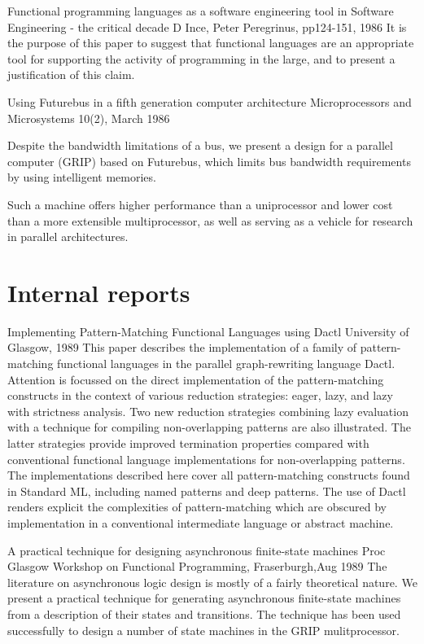 {Functional programming languages as a software engineering tool}
{in Software Engineering - the critical decade D Ince,
Peter Peregrinus, pp124-151, 1986}
{
It is the purpose of this paper to suggest that functional
languages are an appropriate tool for supporting the activity
of programming in the large, and to present a justification of
this claim.
}

{Using Futurebus in a fifth generation computer architecture}
{Microprocessors and Microsystems 10(2), March 1986}
{
Despite the bandwidth limitations of a bus, we present a design
for a parallel computer (GRIP) based on Futurebus, which limits bus
bandwidth requirements by using intelligent memories.

Such a machine offers higher performance than a uniprocessor
and lower cost than a more extensible multiprocessor, as well
as serving as a vehicle for research in parallel architectures.
}


\section{Internal reports}

{Implementing Pattern-Matching Functional Languages using Dactl}
{University of Glasgow, 1989}
{
This paper describes the implementation of a family of  pattern-matching
functional  languages  in  the  parallel graph-rewriting language Dactl.
Attention  is   focussed   on   the   direct   implementation   of   the
pattern-matching   constructs   in  the  context  of  various  reduction
strategies: eager, lazy, and lazy with  strictness  analysis.   Two  new
reduction  strategies  combining  lazy  evaluation  with a technique for
compiling non-overlapping patterns are  also  illustrated.   The  latter
strategies   provide   improved  termination  properties  compared  with
conventional functional  language  implementations  for  non-overlapping
patterns.  The implementations described here cover all pattern-matching
constructs found in Standard  ML,  including  named  patterns  and  deep
patterns.   The  use  of  Dactl  renders  explicit  the  complexities of
pattern-matching which are obscured by implementation in a  conventional
intermediate language or abstract machine.
}

{A practical technique for designing asynchronous finite-state machines}
{Proc Glasgow Workshop on Functional Programming, Fraserburgh,Aug 1989}
{
The literature on asynchronous logic design is mostly of a fairly theoretical
nature.   We present a practical technique for generating asynchronous finite-state
machines from a description of their states and transitions.  The technique
has been used successfully to design a number of state machines in
the GRIP mulitprocessor.
}

